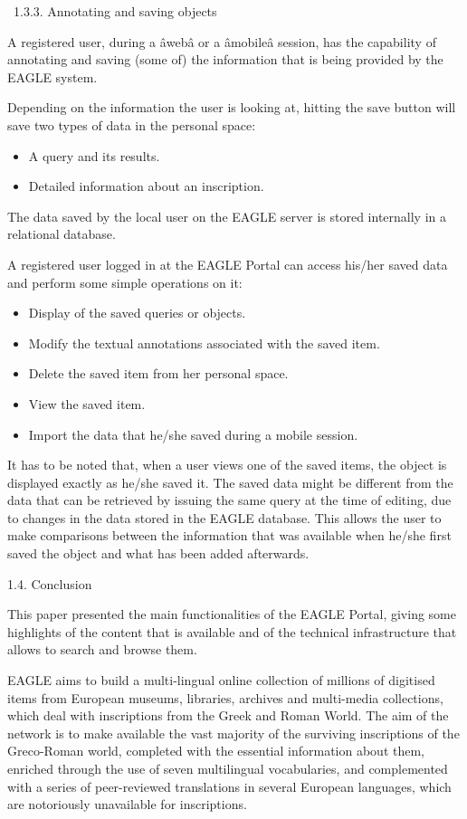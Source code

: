 \bigskip

\ 1.3.3. Annotating and saving objects


\bigskip

A registered user, during a âwebâ or a âmobileâ session, has the capability of annotating and saving (some of) the
information that is being provided by the EAGLE system.

Depending on the information the user is looking at, hitting the save button will save two types of data in the personal
space: 

\begin{itemize}
\item A query and its results.
\item Detailed information about an inscription.
\end{itemize}
The data saved by the local user on the EAGLE server is stored internally in a relational database.

A registered user logged in at the EAGLE Portal can access his/her saved data and perform some simple operations on it:

\begin{itemize}
\item Display of the saved queries or objects.
\item Modify the textual annotations associated with the saved item.
\item Delete the saved item from her personal space.
\item View the saved item.
\item Import the data that he/she saved during a mobile session.
\end{itemize}
It has to be noted that, when a user views one of the saved items, the object is displayed exactly as he/she saved it.
The saved data might be different from the data that can be retrieved by issuing the same query at the time of editing,
due to changes in the data stored in the EAGLE database. This allows the user to make comparisons between the
information that was available when he/she first saved the object and what has been added afterwards.

1.4. Conclusion

This paper presented the main functionalities of the EAGLE Portal, giving some highlights of the content that is
available and of the technical infrastructure that allows to search and browse them.

EAGLE aims to build a multi-lingual online collection of millions of digitised items from European museums, libraries,
archives and multi-media collections, which deal with inscriptions from the Greek and Roman World. The aim of the
network is to make available the vast majority of the surviving inscriptions of the Greco-Roman world, completed with
the essential information about them, enriched through the use of seven multilingual vocabularies, and complemented
with a series of peer-reviewed translations in several European languages, which are notoriously unavailable for
inscriptions. 

